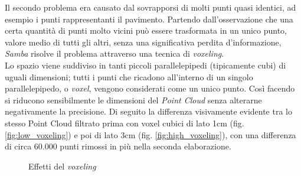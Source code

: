 \noindent
Il secondo problema era causato dal sovrapporsi di molti punti quasi identici, ad esempio i punti rappresentanti il pavimento. Partendo dall'osservazione che una certa quantità di punti molto vicini può essere trasformata in un unico punto, valore medio di tutti gli altri, senza una significativa perdita d'informazione, \emph{Samba} risolve il problema attraverso una tecnica di \emph{voxeling}.\\
Lo spazio viene suddiviso in tanti piccoli parallelepipedi (tipicamente cubi) di uguali dimensioni; tutti i punti che ricadono all'interno di un singolo parallelepipedo, o \emph{voxel}, vengono considerati come un unico punto. Così facendo si riducono sensibilmente le dimensioni del \emph{Point Cloud} senza alterarne negativamente la precisione.
Di seguito la differenza visivamente evidente tra lo stesso Point Cloud filtrato prima con voxel cubici di lato 1cm (fig. \ref{fig:low_voxeling}) e poi di lato 3cm (fig. \ref{fig:high_voxeling}), con una differenza di circa 60.000 punti rimossi in più nella seconda elaborazione.
\begin{figure}[htp] 
    \centering
    \hfill%
    \caption{Effetti del \emph{voxeling}}
\end{figure}
\newline

